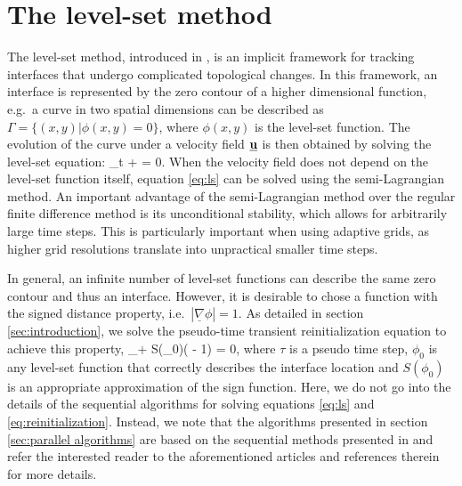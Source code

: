 \section{The level-set method}\label{sec:levelset method}
The level-set method, introduced in \cite{Osher;Sethian:88:Fronts-Propagating-w}, is an implicit framework for tracking interfaces that undergo complicated topological changes. In this framework, an interface is represented by the zero contour of a higher dimensional function, e.g.\ a curve in two spatial dimensions can be described as $\Gamma = \{(x,y) | \phi(x,y) = 0\}$, where $\phi(x,y)$ is the level-set function. The evolution of the curve under a velocity field $\underline{\mathbf{u}}$ is then obtained by solving the level-set equation:
\be
\phi_t + \underline{} \cdot \underline{\nabla} \phi = 0.
\label{eq:ls}
\ee
When the velocity field does not depend on the level-set function itself, equation \eqref{eq:ls} can be solved using the semi-Lagrangian method. An important advantage of the semi-Lagrangian method over the regular finite difference method is its unconditional stability, which allows for arbitrarily large time steps. This is particularly important when using adaptive grids, as higher grid resolutions translate into unpractical smaller time steps.

In general, an infinite number of level-set functions can describe the same zero contour and thus an interface. However, it is desirable to chose a function with the signed distance property, i.e.\ $|\underline{\nabla} \phi| = 1$. As detailed in section \ref{sec:introduction}, we solve the pseudo-time transient reinitialization equation \cite{Sussman;Smereka;Osher:94:A-Level-Set-Approach, Osher;Fedkiw:01:Level-Set-Methods:-A} to achieve this property,
\be
\phi_\tau + S(\phi_0)\left(\lvert \underline{\nabla} \phi \rvert - 1\right) = 0,
\label{eq:reinitialization}
\ee
where $\tau$ is a pseudo time step, $\phi_0$ is any level-set function that correctly describes the interface location and $S(\phi_0)$ is an appropriate approximation of the sign function. Here, we do not go into the details of the sequential algorithms for solving equations \eqref{eq:ls} and \eqref{eq:reinitialization}. Instead, we note that the algorithms presented in section \ref{sec:parallel algorithms} are based on the sequential methods presented in \cite{Min;Gibou:07:A-second-order-accur} and refer the interested reader to the aforementioned articles and references therein for more details.